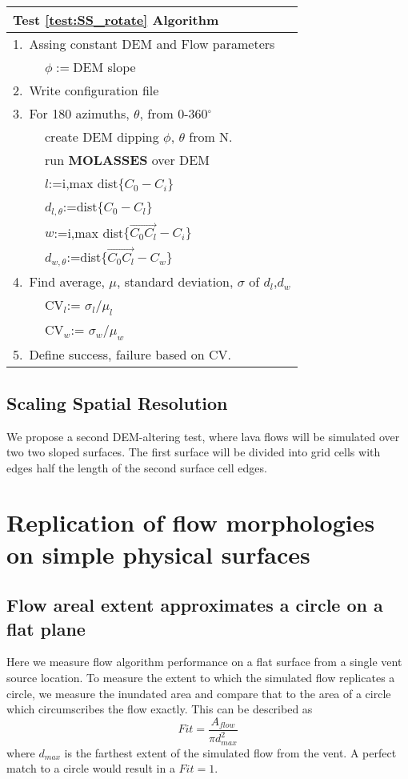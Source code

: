 \documentclass[12pt,letter]{article}
\newcommand{\tabitem}{~~\llap{\textbullet}~~}
\begin{document}
\begin{center}
	\begin{tabular}{l}
		\toprule
		\textbf{Test \ref{test:SS_rotate} Algorithm}\\
		\midrule
		1.~Assing constant DEM and Flow parameters\\
			~\tabitem $\phi:=$DEM slope\\
		2.~Write configuration file\\
		3.~For 180 azimuths, $\theta$, from 0-360$^{\circ}$\\
			~\tabitem create DEM dipping $\phi$, $\theta$ from N.\\
			~\tabitem run \textbf{MOLASSES} over DEM\\
			~\tabitem $l$:=i,max dist$\{C_0-C_i\}$\\
			~\tabitem $d_{l,\theta}$:=dist$\{C_0-C_l\}$\\
			~\tabitem $w$:=i,max dist$\{\overrightarrow{C_0C_l}-C_i\}$\\
			~\tabitem $d_{w,\theta}$:=dist$\{\overrightarrow{C_0C_l}-C_w\}$\\
		4.~Find average, $\mu$, standard deviation, $\sigma$ of $d_l$,$d_w$\\
			~\tabitem CV$_l$:= $\sigma_l/\mu_l$\\
			~\tabitem CV$_w$:= $\sigma_w/\mu_w$\\
		5.~Define success, failure based on CV.
		\bottomrule
	\end{tabular}
\end{center}

\subsection{Scaling Spatial Resolution}\label{test:SS_resolution}
We propose a second DEM-altering test, where lava flows will be simulated over two two sloped surfaces. The first surface will be divided into grid cells with edges half the length of the second surface cell edges.


\section{Replication of flow morphologies on simple physical surfaces}

\subsection{Flow areal extent approximates a circle on a flat plane}\label{test:Bing_circ}
Here we measure flow algorithm performance on a flat surface from a single vent source location. To measure the extent to which the simulated flow replicates a circle, we measure the inundated area and compare that to the area of a circle which circumscribes the flow exactly. This can be described as
\begin{equation}
Fit = \frac{A_{flow}}{\pi d_{max}^2}
\end{equation}
where $d_{max}$ is the farthest extent of the simulated flow from the vent. A perfect match to a circle would result in a $Fit=1$. 
\end{document}
